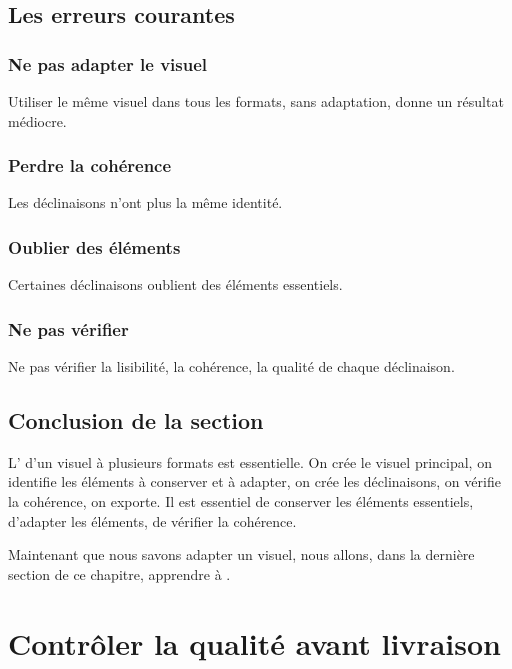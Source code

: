 \subsection{Les erreurs courantes}

\subsubsection{Ne pas adapter le visuel}

Utiliser le même visuel dans tous les formats, sans adaptation, donne un résultat médiocre.

\subsubsection{Perdre la cohérence}

Les déclinaisons n'ont plus la même identité.

\subsubsection{Oublier des éléments}

Certaines déclinaisons oublient des éléments essentiels.

\subsubsection{Ne pas vérifier}

Ne pas vérifier la lisibilité, la cohérence, la qualité de chaque déclinaison.

\subsection*{Conclusion de la section}

L' d'un visuel à plusieurs formats est essentielle. On crée le visuel principal, on identifie les éléments à conserver et à adapter, on crée les déclinaisons, on vérifie la cohérence, on exporte. Il est essentiel de conserver les éléments essentiels, d'adapter les éléments, de vérifier la cohérence.

Maintenant que nous savons adapter un visuel, nous allons, dans la dernière section de ce chapitre, apprendre à .

\section{Contrôler la qualité avant livraison}

